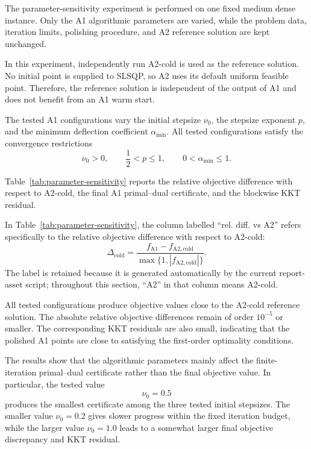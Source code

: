 \documentclass[12pt]{article}
\begin{document}
The parameter-sensitivity experiment is performed on one fixed medium
dense instance. Only the A1 algorithmic parameters are varied, while
the problem data, iteration limits, polishing procedure, and A2
reference solution are kept unchanged.

In this experiment, independently run A2-cold is used as the reference
solution. No initial point is supplied to SLSQP, so A2 uses its default
uniform feasible point. Therefore, the reference solution is
independent of the output of A1 and does not benefit from an A1
warm start.

The tested A1 configurations vary the initial stepsize $\nu_0$, the
stepsize exponent $p$, and the minimum deflection coefficient
$\alpha_{\min}$. All tested configurations satisfy the convergence
restrictions
\[
\nu_0>0,
\qquad
\frac{1}{2}<p\leq 1,
\qquad
0<\alpha_{\min}\leq 1.
\]

Table~\ref{tab:parameter-sensitivity} reports the relative objective
difference with respect to A2-cold, the final A1 primal--dual
certificate, and the blockwise KKT residual.

\begin{table}[htbp]
    \centering
    \caption{Sensitivity on one fixed medium dense instance. Every
    tested setting satisfies the convergence restrictions. The A2
    reference is independently run A2-cold from the uniform feasible
    point.}
    \label{tab:parameter-sensitivity}
    \resizebox{\textwidth}{!}{%
        
    }
\end{table}

In Table~\ref{tab:parameter-sensitivity}, the column labelled
``rel. diff. vs A2'' refers specifically to the relative objective
difference with respect to A2-cold:
\[
\Delta_{\mathrm{cold}}
=
\frac{
f_{\mathrm{A1}}-f_{\mathrm{A2,cold}}
}{
\max\{1,|f_{\mathrm{A2,cold}}|\}
}.
\]
The label is retained because it is generated automatically by the
current report-asset script; throughout this section, ``A2'' in that
column means A2-cold.

All tested configurations produce objective values close to the
A2-cold reference solution. The absolute relative objective
differences remain of order $10^{-5}$ or smaller. The corresponding
KKT residuals are also small, indicating that the polished A1 points
are close to satisfying the first-order optimality conditions.

The results show that the algorithmic parameters mainly affect the
finite-iteration primal--dual certificate rather than the final
objective value. In particular, the tested value
\[
\nu_0=0.5
\]
produces the smallest certificate among the three tested initial
stepsizes. The smaller value $\nu_0=0.2$ gives slower progress within
the fixed iteration budget, while the larger value $\nu_0=1.0$ leads
to a somewhat larger final objective discrepancy and KKT residual.
\end{document}
